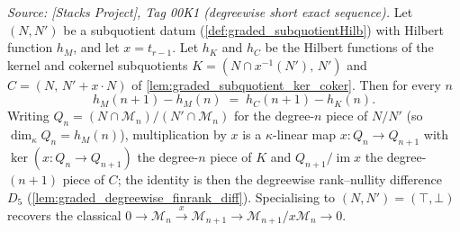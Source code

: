 \begin{lemma}\leanok
  \label{lem:graded_subquotient_degreewise_diff}
  \textit{Source: [Stacks Project], Tag 00K1 (degreewise short exact sequence).}
  Let \((N, N')\) be a subquotient datum (\cref{def:graded_subquotientHilb}) with
  Hilbert function \(h_M\), and let \(x = t_{r-1}\). Let \(h_K\) and \(h_C\) be the
  Hilbert functions of the kernel and cokernel subquotients
  \(K = (N \cap x^{-1}(N'),\, N')\) and \(C = (N,\, N' + x \cdot N)\) of
  \cref{lem:graded_subquotient_ker_coker}. Then for every \(n\)
  \[
    h_M(n+1) - h_M(n) \;=\; h_C(n+1) - h_K(n).
  \]
  Writing \(Q_n = (N \cap \mathcal{M}_n)/(N' \cap \mathcal{M}_n)\) for the
  degree-\(n\) piece of \(N/N'\) (so \(\dim_\kappa Q_n = h_M(n)\)), multiplication by
  \(x\) is a \(\kappa\)-linear map \(x : Q_n \to Q_{n+1}\) with
  \(\ker(x : Q_n \to Q_{n+1})\) the degree-\(n\) piece of \(K\) and
  \(Q_{n+1}/\operatorname{im} x\) the degree-\((n+1)\) piece of \(C\); the identity is
  then the degreewise rank--nullity difference \(D_5\)
  (\cref{lem:graded_degreewise_finrank_diff}). Specialising to \((N, N') = (\top,
  \bot)\) recovers the classical \(0 \to \mathcal{M}_n \xrightarrow{x}
  \mathcal{M}_{n+1} \to \mathcal{M}_{n+1}/x\mathcal{M}_n \to 0\).
\end{lemma}

